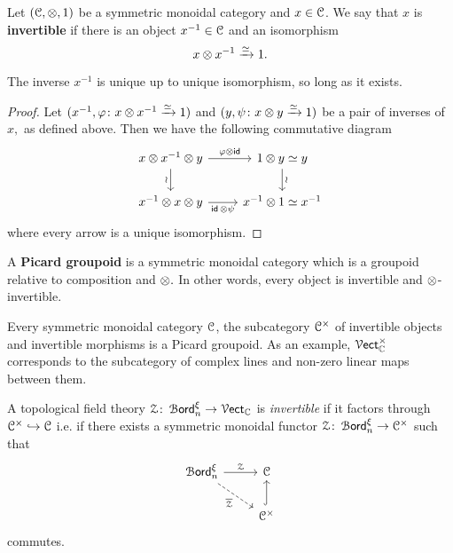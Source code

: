 \begin{definition}
Let $(\mathcal C,\otimes,1)$ be a symmetric monoidal category and $x\in\mathcal C$. We say that $x$ is \textbf{invertible} if there is an object $x^{-1}\in \mathcal C$ and an isomorphism \[x\otimes x^{-1}\xrightarrow{\simeq}1.\]
\end{definition}
\begin{lemma}
The inverse $x^{-1}$ is unique up to unique isomorphism, so long as it exists.
\end{lemma}
\begin{proof}
Let $(x^{-1},\varphi \colon x\otimes x^{-1} \xrightarrow{\simeq} 1)$ and $(y,\psi\colon x\otimes y \xrightarrow{\simeq}1)$ be a pair of inverses of $x,$ as defined above. Then we have the following commutative diagram
\[\begin{tikzcd}
	{x\ot x^{-1}\ot y} & {1\ot y\simeq y} \\
	{x^{-1}\ot x \ot y} & {x^{-1}\ot 1\simeq x^{-1}}
	\arrow["\wr"', from=1-1, to=2-1]
	\arrow["\id\ot\psi"', from=2-1, to=2-2]
	\arrow["{\varphi\ot \id}", from=1-1, to=1-2]
	\arrow["\wr", from=1-2, to=2-2]
\end{tikzcd}\]
where every arrow is a unique isomorphism.
\end{proof}
\begin{definition}
A \textbf{Picard groupoid} is a symmetric monoidal category which is a groupoid relative to composition and $\otimes.$ In other words, every object is invertible and $\otimes$-invertible.
\end{definition}
\begin{observation}
Every symmetric monoidal category $\mathcal C$, the subcategory $\mathcal C^\times$ of invertible objects and invertible morphisms is a Picard groupoid. As an example, $\operatorname{\mathcal V{\sf ect}}^{\times}_\mathbb C$ corresponds to the subcategory of complex lines and non-zero linear maps between them.
\end{observation}
\begin{definition}
A topological field theory $\mathcal Z\colon \operatorname{\mathcal B{\sf ord}}^{\xi}_n\rightarrow \operatorname{\mathcal V{\sf ect}}_\mathbb C$ is \textit{invertible} if it factors through $\mathcal C^{\times} \hookrightarrow \mathcal C$ i.e. if there exists a symmetric monoidal functor $\mathcal Z \colon \operatorname{\mathcal B{\sf ord}}^{\xi}_n \rightarrow \mathcal C^{\times}$ such that 
\[\begin{tikzcd}
	{\Bord^{\xi}_n} & \cC \\
	& {\cC^\times}
	\arrow["\cZ", from=1-1, to=1-2]
	\arrow[hook, from=2-2, to=1-2]
	\arrow["\overline\cZ"', dashed, from=1-1, to=2-2]
\end{tikzcd}\]
commutes.
\end{definition}


